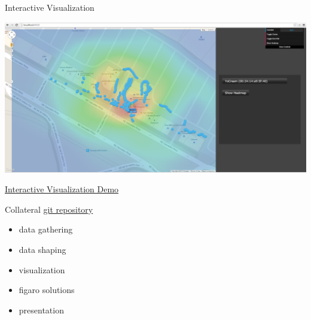 \documentclass[11pt]{beamer}
\begin{document}
\begin{frame}{Interactive Visualization}

\includegraphics[height=0.55\textheight]{pictures/screenshot4.png}

\href{http://localhost:8000/}{Interactive Visualization Demo}

\end{frame}

\begin{frame}{Collateral}
\href{https://github.com/simlay/wifi-collection}{git repository}
\begin{itemize}
\item data gathering
\item data shaping
\item visualization
\item figaro solutions
\item presentation
\end{itemize}

\end{frame}
\end{document}
